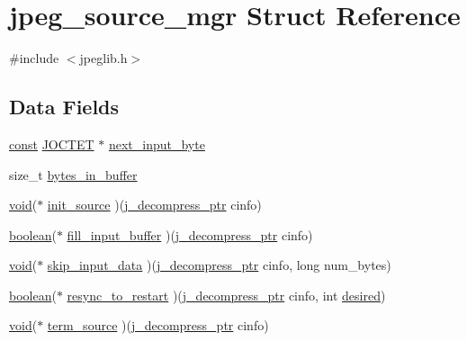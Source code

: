 \hypertarget{structjpeg__source__mgr}{}\section{jpeg\+\_\+source\+\_\+mgr Struct Reference}
\label{structjpeg__source__mgr}


{\ttfamily \#include $<$jpeglib.\+h$>$}

\subsection*{Data Fields}
\begin{DoxyCompactItemize}
\item 
\hyperlink{zconf_8h_a2c212835823e3c54a8ab6d95c652660e}{const} \hyperlink{jmorecfg_8h_a356ad249f20e691b520da439f92cccbc}{J\+O\+C\+T\+ET} $\ast$ \hyperlink{structjpeg__source__mgr_aad884e7f4ba7496ab0f56c942c7585c1}{next\+\_\+input\+\_\+byte}
\item 
size\+\_\+t \hyperlink{structjpeg__source__mgr_a8ecb72557c1c9666d77fffea074282a4}{bytes\+\_\+in\+\_\+buffer}
\item 
\hyperlink{png_8h_ac9c84fa68bbad002983e35ce3663c686}{void}($\ast$ \hyperlink{structjpeg__source__mgr_a6bc2fa084b056a2187b4ef83371eb27c}{init\+\_\+source} )(\hyperlink{jpeglib_8h_a00c7d78af44bd26a901c791ccfc1e178}{j\+\_\+decompress\+\_\+ptr} cinfo)
\item 
\hyperlink{jconfig_8h_a7670a4e8a07d9ebb00411948b0bbf86d}{boolean}($\ast$ \hyperlink{structjpeg__source__mgr_a859e3c7466e3756d8ad46259443ce94d}{fill\+\_\+input\+\_\+buffer} )(\hyperlink{jpeglib_8h_a00c7d78af44bd26a901c791ccfc1e178}{j\+\_\+decompress\+\_\+ptr} cinfo)
\item 
\hyperlink{png_8h_ac9c84fa68bbad002983e35ce3663c686}{void}($\ast$ \hyperlink{structjpeg__source__mgr_a50932fc835dea9941ebe825ef08f3e1d}{skip\+\_\+input\+\_\+data} )(\hyperlink{jpeglib_8h_a00c7d78af44bd26a901c791ccfc1e178}{j\+\_\+decompress\+\_\+ptr} cinfo, long num\+\_\+bytes)
\item 
\hyperlink{jconfig_8h_a7670a4e8a07d9ebb00411948b0bbf86d}{boolean}($\ast$ \hyperlink{structjpeg__source__mgr_aad6c53cd531bedebd8f4a4617944affa}{resync\+\_\+to\+\_\+restart} )(\hyperlink{jpeglib_8h_a00c7d78af44bd26a901c791ccfc1e178}{j\+\_\+decompress\+\_\+ptr} cinfo, int \hyperlink{jpeglib_8h_a3450f7500f843178b4517d0e7ef2b537}{desired})
\item 
\hyperlink{png_8h_ac9c84fa68bbad002983e35ce3663c686}{void}($\ast$ \hyperlink{structjpeg__source__mgr_aa1a163d908533a500d1b577b379309ad}{term\+\_\+source} )(\hyperlink{jpeglib_8h_a00c7d78af44bd26a901c791ccfc1e178}{j\+\_\+decompress\+\_\+ptr} cinfo)
\end{DoxyCompactItemize}


